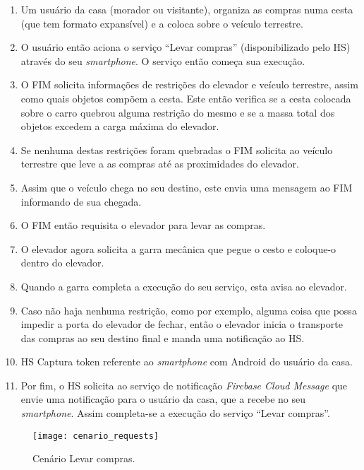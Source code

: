 \begin{enumerate}
\item Um usuário da casa (morador ou visitante), organiza as compras numa cesta (que tem formato expansível) e a coloca sobre o veículo terrestre.
\item O usuário então aciona o serviço ``Levar compras'' (disponibilizado pelo HS) através do seu \textit{smartphone}. O serviço então começa sua execução.
\item O FIM solicita informações de restrições do elevador e veículo terrestre, assim como quais objetos compõem a cesta. Este então verifica se a cesta colocada sobre o carro quebrou alguma restrição do mesmo e se a massa total dos objetos excedem a carga máxima do elevador.
\item Se nenhuma destas restrições foram quebradas o FIM solicita ao veículo terrestre que leve a as compras até as proximidades do elevador.
\item Assim que o veículo chega no seu destino, este envia uma mensagem ao FIM informando de sua chegada.
\item O FIM então requisita o elevador para levar as compras.
\item O elevador agora solicita a garra mecânica que pegue o cesto e coloque-o dentro do elevador.
\item Quando a garra completa a execução do seu serviço, esta avisa ao elevador.
\item Caso não haja nenhuma restrição, como por exemplo, alguma coisa que possa impedir a porta do elevador de fechar, então o elevador inicia o transporte das compras ao seu destino final e manda uma notificação ao HS.
\item HS Captura token referente ao \textit{smartphone} com Android\footnotemark {} do usuário da casa.
\item Por fim, o HS solicita ao serviço de notificação \textit{Firebase Cloud Message}\footnotemark {} que envie uma notificação para o usuário da casa, que a recebe no seu \textit{smartphone}. Assim completa-se a execução do serviço ``Levar compras''.
\end{enumerate}
        
\begin{figure}[!htb] \centering 
  \centering
  \texttt{[image: cenario\_requests]} 
  \caption{Cenário Levar compras.} 
  \label{fig:cenario}
\end{figure}

